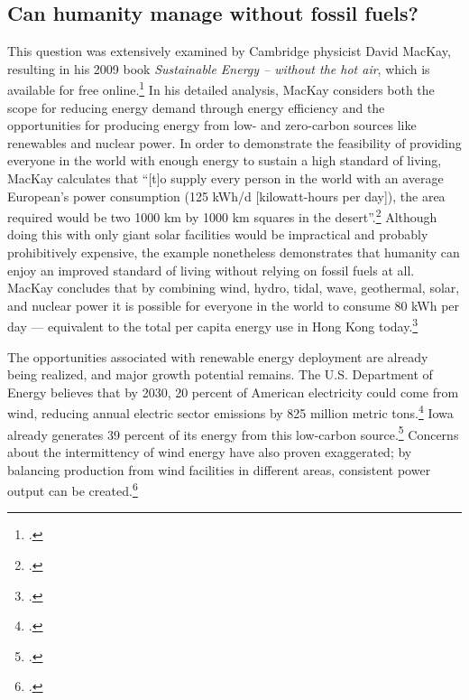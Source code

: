 \documentclass[10pt]{article}
\begin{document}
	
	\subsection{Can humanity manage without fossil fuels?}
	\label{DoingWithout}



This question was extensively examined by Cambridge physicist David MacKay, resulting in his 2009 book \emph{Sustainable Energy – without the hot air}, which is available for free online.\footcite[][]{MacKay2009}
In his detailed analysis, MacKay considers both the scope for reducing energy demand through energy efficiency and the opportunities for producing energy from low- and zero-carbon sources like renewables and nuclear power.
In order to demonstrate the feasibility of providing everyone in the world with enough energy to sustain a high standard of living, MacKay calculates that ``[t]o supply every person in the world with an average European's power consumption (125 kWh/d [kilowatt-hours per day]), the area required would be two 1000 km by 1000 km squares in the desert''.\footcite[][p. 178]{MacKay2009}
Although doing this with only giant solar facilities would be impractical and probably prohibitively expensive, the example nonetheless demonstrates that humanity can enjoy an improved standard of living without relying on fossil fuels at all.
MacKay concludes that by combining wind, hydro, tidal, wave, geothermal, solar, and nuclear power it is possible for everyone in the world to consume 80 kWh per day --- equivalent to the total per capita energy use in Hong Kong today.\footcite[][p. 106, 238]{MacKay2009}



The opportunities associated with renewable energy deployment are already being realized, and major growth potential remains.
The U.S. Department of Energy believes that by 2030, 20 percent of American electricity could come from wind, reducing annual electric sector  emissions by 825 million metric tons.\footcite[][]{20PercentBy2030}
Iowa already generates 39 percent of its energy from this low-carbon source.\footcite[][]{BlownAway}
Concerns about the intermittency of wind energy have also proven exaggerated; by balancing production from wind facilities in different areas, consistent power output can be created.\footcite[][]{BlownAway}
\end{document}
